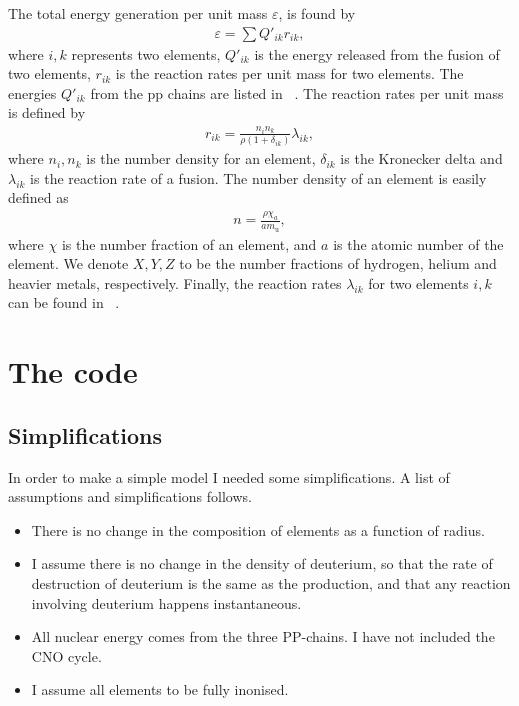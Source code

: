 \documentclass[a4paper, 11pt, english]{article}
\begin{document}
The total energy generation per unit mass $\varepsilon$, is found by
\begin{align}
	\varepsilon = \sum Q'_{ik} r_{ik},
	\label{eq:epsilon}
\end{align}
where $i,k$ represents two elements, $Q'_{ik}$ is the energy released from the fusion of
two elements, $r_{ik}$ is the reaction rates per unit mass for two elements. The energies
$Q'_{ik}$ from the pp chains are listed in ~\cite[p.~39, Table~2.1]{stix}. The reaction
rates per unit mass is defined by
\begin{align}
	r_{ik} = \frac{n_i n_k}{\rho(1 + \delta_{ik})} \lambda_{ik},
	\label{eq:r}
\end{align}
where $n_i,n_k$ is the number density for an element, $\delta_{ik}$ is the Kronecker delta and
$\lambda_{ik}$ is the reaction rate of a fusion. The number density of an element is
easily defined as
\begin{align}
	n = \frac{\rho \chi_a}{am_{\mathrm{u}}},
	\label{eq:n}
\end{align}
where $\chi$ is the number fraction of an element, and $a$ is the atomic number of the
element. We denote $X, Y, Z$ to be the number fractions of hydrogen, helium and heavier
metals, respectively. Finally, the reaction rates $\lambda_{ik}$ for two elements
$i,k$ can be found in ~\cite[p.~46, Table~2.3]{stix}.


\section{The code}
\subsection{Simplifications}

In order to make a simple model I needed some simplifications. A list of
assumptions and simplifications follows.
\begin{itemize}
	\item[\textbullet] There is no change in the composition of elements as a function of
		radius. 
	\item[\textbullet] I assume there is no change in the density of deuterium, so that
		the rate of destruction of deuterium is the same as the production, and that any
		reaction involving deuterium happens instantaneous.
	\item[\textbullet] All nuclear energy comes from the three PP-chains. I have not
		included the CNO cycle.
	\item[\textbullet] I assume all elements to be fully inonised.
\end{itemize}
\end{document}

